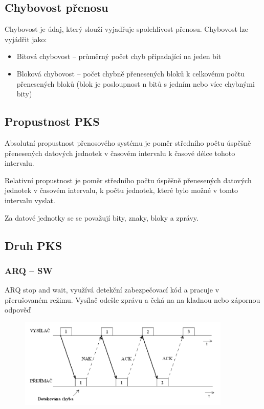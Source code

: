 \subsection{Chybovost přenosu}

Chybovost je údaj, který slouží vyjadřuje spolehlivost přenosu.
Chybovost lze vyjádřit jako:

\begin{itemize}[noitemsep]
    \item Bitová chybovost -- průměrný počet chyb připadající na jeden bit
    \item Bloková chybovost -- počet chybně přenesených bloků k celkovému počtu přenesených bloků (blok je posloupnost n bitů s jedním nebo více chybnými bity)
\end{itemize}

\subsection{Propustnost PKS}

Absolutní propustnost přenosového systému je poměr středního počtu úspěšně přenesených datových jednotek v časovém intervalu k časové délce tohoto intervalu.

Relativní propustnost je poměr středního počtu úspěšně přenesených datových jednotek v časovém intervalu, k počtu jednotek, které bylo možné v tomto intervalu vyslat.

Za datové jednotky se se považují bity, znaky, bloky a zprávy.

\subsection{Druh PKS}

\subsubsection{ARQ -- SW}

ARQ stop and wait, využívá detekční zabezpečovací kód a pracuje v přerušovaném režimu.
Vysílač odešle zprávu a čeká na na kladnou nebo zápornou odpověď

\begin{figure}[h]
    \centering
    \includegraphics[width=0.9\textwidth]{images/030.png}
\end{figure}

